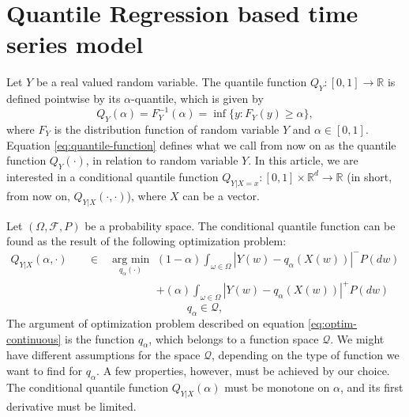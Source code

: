 \section{Quantile Regression based time series model}

Let $Y$ be a real valued random variable. The quantile function $Q_Y:[0,1] \rightarrow \mathbb{R}$ is defined pointwise by its $\alpha$-quantile, which is given by
\begin{equation}
Q_Y(\alpha) = F_Y^{-1}(\alpha) = \inf\{y: F_Y(y) \geq \alpha\},
\label{eq:quantile-function}
\end{equation}
where $F_Y$ is the distribution function of random variable $Y$ and $\alpha \in [0,1]$. Equation \ref{eq:quantile-function} defines what we call from now on as the quantile function $Q_Y(\cdot)$, in relation to random variable $Y$. In this article, we are interested in a conditional quantile function $Q_{Y|X=x}:[0,1] \times \mathbb{R}^d \rightarrow \mathbb{R}$ (in short, from now on, $Q_{Y|X}(\cdot, \cdot)$), where $X$ can be a vector.


Let $(\Omega, \mathcal{F}, P)$ be a probability space. The conditional quantile function can be found as the result of the following optimization problem:
\begin{eqnarray}
Q_{Y|X}(\alpha, \cdot)\quad & \in\quad\underset{q_\alpha(\cdot)}{\text{arg min}}\, &
(1-\alpha)\int_{\omega \in \Omega}|Y(w)-q_\alpha(X(w))|^{-}P(dw) \label{eq:optim-continuous}
\\ & & + (\alpha)\int_{\omega \in \Omega}|Y(w)-q_\alpha(X(w))|^{+}P(dw) \nonumber
\end{eqnarray}
\begin{equation}
q_\alpha  \in \mathcal{Q},
\end{equation}
The argument of optimization problem described on equation \ref{eq:optim-continuous} is the function $q_\alpha$, which belongs to a function space $\mathcal{Q}$. We might have different assumptions for the space $\mathcal{Q}$, depending on the type of function we want to find for $q_\alpha$. A few properties, however, must be achieved by our choice. The conditional quantile function $Q_{Y|X}(\alpha)$ must be monotone on $\alpha$, and its first derivative must be limited.

